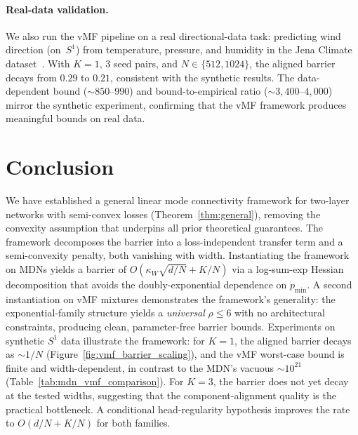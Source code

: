 \documentclass[11pt]{article}
\begin{document}
\paragraph{Real-data validation.}
We also run the vMF pipeline on a real directional-data task: predicting
wind direction (on~$S^1$) from temperature, pressure, and humidity
in the Jena Climate dataset~\cite{jena_climate}.
With $K = 1$, 3 seed pairs, and $N \in \{512, 1024\}$, the aligned
barrier decays from $0.29$ to $0.21$, consistent with the synthetic
results.
The data-dependent bound ($\sim\!850$--$990$) and bound-to-empirical
ratio ($\sim\!3{,}400$--$4{,}000$) mirror the synthetic experiment,
confirming that the vMF framework produces meaningful bounds on
real data.

\section{Conclusion}\label{sec:conclusion}

We have established a general linear mode connectivity framework for
two-layer networks with semi-convex losses
(Theorem~\ref{thm:general}), removing the convexity assumption that
underpins all prior theoretical guarantees.
The framework decomposes the barrier into a loss-independent transfer
term and a semi-convexity penalty, both vanishing with width.
Instantiating the framework on MDNs yields a barrier of
$O(\kappa_W\sqrt{d/N}+K/N)$ via a log-sum-exp Hessian decomposition
that avoids the doubly-exponential dependence on $p_{\min}$.
A second instantiation on vMF mixtures demonstrates the framework's
generality: the exponential-family structure yields a \emph{universal}
$\rho \le 6$ with no architectural constraints, producing clean,
parameter-free barrier bounds.
Experiments on synthetic $S^1$ data illustrate the framework:
for $K = 1$, the aligned barrier decays as $\sim 1/N$
(Figure~\ref{fig:vmf_barrier_scaling}), and the vMF worst-case bound
is finite and width-dependent, in contrast to the MDN's
vacuous $\sim\!10^{21}$
(Table~\ref{tab:mdn_vmf_comparison}).
For $K = 3$, the barrier does not yet decay at the tested widths,
suggesting that the component-alignment quality is the practical
bottleneck.
A conditional head-regularity hypothesis improves the rate
to $O(d/N + K/N)$ for both families.
\end{document}
